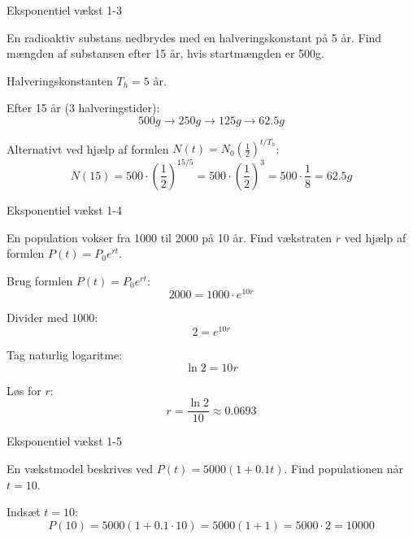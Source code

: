 \documentclass{article}
\begin{document}
\begin{exercise}{Eksponentiel vækst 1-3}

En radioaktiv substans nedbrydes med en halveringskonstant på 5 år. Find mængden af substansen efter 15 år, hvis startmængden er 500g.


\hint

Halveringskonstanten $T_h = 5$ år.

\hint

Efter 15 år (3 halveringstider):
\[
500g \rightarrow 250g \rightarrow 125g \rightarrow 62.5g
\]

\hint

Alternativt ved hjælp af formlen $N(t) = N_0 (\frac{1}{2})^{t/T_h}$:
\[
N(15) = 500 \cdot (\frac{1}{2})^{15/5} = 500 \cdot (\frac{1}{2})^3 = 500 \cdot \frac{1}{8} = 62.5g
\]

\end{exercise}

\newpage

\begin{exercise}{Eksponentiel vækst 1-4}

En population vokser fra 1000 til 2000 på 10 år. Find vækstraten $r$ ved hjælp af formlen $P(t) = P_0 e^{rt}$.


\hint

Brug formlen $P(t) = P_0 e^{rt}$:
\[
2000 = 1000 \cdot e^{10r}
\]

\hint

Divider med 1000:
\[
2 = e^{10r}
\]

\hint

Tag naturlig logaritme:
\[
\ln 2 = 10r
\]

\hint

Løs for $r$:
\[
r = \frac{\ln 2}{10} \approx 0.0693
\]

\end{exercise}

\newpage

\begin{exercise}{Eksponentiel vækst 1-5}

En vækstmodel beskrives ved $P(t) = 5000 (1 + 0.1t)$. Find populationen når $t = 10$.


\hint

Indsæt $t = 10$:
\[
P(10) = 5000 (1 + 0.1 \cdot 10) = 5000 (1 + 1) = 5000 \cdot 2 = 10000
\]

\end{exercise}
\end{document}
